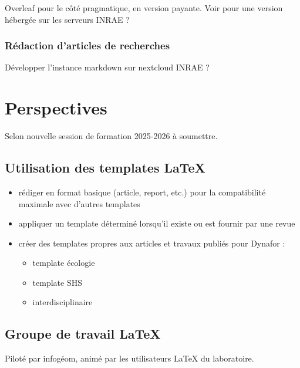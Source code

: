 \documentclass[
]{article}
\providecommand{\tightlist}{%
  \setlength{\itemsep}{0pt}\setlength{\parskip}{0pt}}
\begin{document}
Overleaf pour le côté pragmatique, en version payante. Voir pour une
version hébergée sur les serveurs INRAE ?

\hypertarget{ruxe9daction-darticles-de-recherches}{%
\subsubsection{Rédaction d'articles de
recherches}\label{ruxe9daction-darticles-de-recherches}}

Développer l'instance markdown sur nextcloud INRAE ?

\hypertarget{perspectives}{%
\section{Perspectives}\label{perspectives}}

Selon nouvelle session de formation 2025-2026 à soumettre.

\hypertarget{utilisation-des-templates-latex}{%
\subsection{Utilisation des templates
LaTeX}\label{utilisation-des-templates-latex}}

\begin{itemize}
\tightlist
\item
  rédiger en format basique (article, report, etc.) pour la
  compatibilité maximale avec d'autres templates
\item
  appliquer un template déterminé lorsqu'il existe ou est fournir par
  une revue
\item
  créer des templates propres aux articles et travaux publiés pour
  Dynafor :

  \begin{itemize}
  \tightlist
  \item
    template écologie
  \item
    template SHS
  \item
    interdisciplinaire
  \end{itemize}
\end{itemize}

\hypertarget{groupe-de-travail-latex}{%
\subsection{Groupe de travail LaTeX}\label{groupe-de-travail-latex}}

Piloté par infogéom, animé par les utilisateurs LaTeX du laboratoire.
\end{document}
